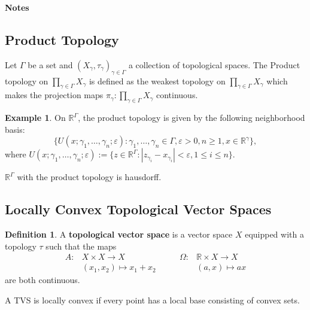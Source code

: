 \documentclass[11pt, reqno]{article}
\theoremstyle{plain}
\theoremstyle{definition}
\newtheorem*{definition}{Definition}
\newtheorem*{example}{Example}
\theoremstyle{remark}
\renewcommand{\epsilon}{\varepsilon}
\begin{document}
\topmargin=-40pt
\renewcommand{\headrulewidth}{1pt}
\renewcommand{\headsep}{20pt}
\thispagestyle{fancy}

{\Huge \bfseries {} Notes}

\subsection*{Product Topology}

Let $\Gamma$ be a set and $(X_\gamma, \tau_\gamma)_{\gamma \in \Gamma}$ a collection of topological
spaces. The Product topology on $\prod_{\gamma \in \Gamma}X_\gamma$ is defined as the weakest topology on 
$\prod_{\gamma \in \Gamma}X_\gamma$ which makes the projection maps $\pi_\gamma: \prod_{\gamma \in \Gamma} X_\gamma$
continuous.

\begin{example}
    On $\mathbb{R}^\Gamma$, the product topology is given by the following neighborhood basis:
    \[
    \{U(x; \gamma_1, \dots, \gamma_n; \epsilon): \gamma_1, \dots,\gamma_n \in \Gamma, \epsilon > 0, n \geq 1, x \in \mathbb{R}^\gamma\},
    \]
    where $U(x; \gamma_1, \dots, \gamma_n; \epsilon) := \{z \in \mathbb{R}^\Gamma: |z_{\gamma_i} - x_{\gamma_i}| < \epsilon,
    1 \leq i \leq n\}$.

    $\mathbb{R}^\Gamma$ with the product topology is hausdorff.
\end{example}

\subsection*{Locally Convex Topological Vector Spaces}

\begin{definition}
    A \textbf{topological vector space} is a vector space $X$ equipped with a topology $\tau$ such that the maps 
    \[
    \begin{split}
        A: & X\times X \rightarrow X\\
        & (x_1, x_2) \mapsto x_1 + x_2
    \end{split} \qquad 
    \begin{split}
        \Omega: & \mathbb{R}\times X \rightarrow X\\
        & (a, x) \mapsto ax
    \end{split}
    \]
    are both continuous. 

    A TVS is locally convex if every point has a local base consisting of convex sets.
\end{definition}
\end{document}

